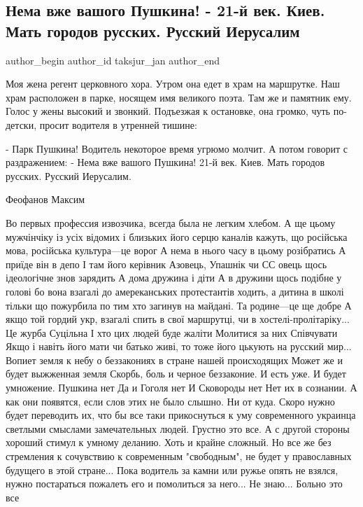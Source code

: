  
 
 
 
 
 
\subsection{Нема вже вашого Пушкина! - 21-й век. Киев. Мать городов русских. Русский Иерусалим}
\label{sec:27_05_2021.fb.taksjur_jan.1.pushkin_kiev_xxi_vek_ierusalim}
\ifcmt
 author_begin
   author_id taksjur_jan
 author_end
\fi

Моя жена регент церковного хора. Утром она едет в храм на маршрутке. Наш храм
расположен в парке, носящем имя великого поэта. Там же и памятник ему. Голос у
жены высокий и звонкий. Подъезжая к остановке, она громко, чуть по-детски,
просит водителя в утренней тишине:

\obeycr
- Парк Пушкина!
Водитель некоторое время угрюмо молчит. А потом говорит с раздражением:
- Нема вже вашого Пушкина!
21-й век. Киев. Мать городов русских. Русский Иерусалим.
\restorecr

Феофанов Максим

Во первых профессия извозчика, всегда была не легким хлебом.
А ще цьому мужчінчіку із усіх відомих і близьких його серцю каналів кажуть, що російська мова, російська культура—це ворог
А нема в нього часу в цьому розібратись
А приїде він в депо
І там його керівник
Азовець, Упашнік чи СС овець щось ідеологічне знов зарядить
А дома дружина і діти
А в дружини щось подібне у голові бо вона взагалі до амереканських протестантів ходить, а дитина в школі тільки що пожурбила по тим хто загинув на майдані.
Та родине—це ще добре
А якщо той гордий укр, взагалі спить в свої маршрутці, чи в хостелі-пролітаріку...
Це журба
Суцільна
І хто цих людей буде жаліти
Молитися за них
Співчувати
Якщо і навіть його мати чи батько живі, то тоже його цькують на русский мир...
Вопиет земля к небу о беззакониях в стране нашей происходящих
Может же и будет выжженная земля
Скорбь, боль и черное беззаконие. И есть уже. И будет умножение.
Пушкина нет
Да и Гоголя нет
И Сковороды нет
Нет их в сознании.
А как они появятся, если слов этих не было слышно.
Ни от куда.
Скоро нужно будет переводить их, что бы все таки прикоснуться к уму современного украинца светлыми смыслами замечательных людей.
Грустно это все.
А с другой стороны хороший стимул к умному деланию.
Хоть и крайне сложный.
Но все же без стремления к сочувствию к современным "свободным", не будет у православных будущего в этой стране...
Пока водитель за камни или ружье опять не взялся, нужно постараться пожалеть его и помолиться за него...
Не знаю...
Больно это все

